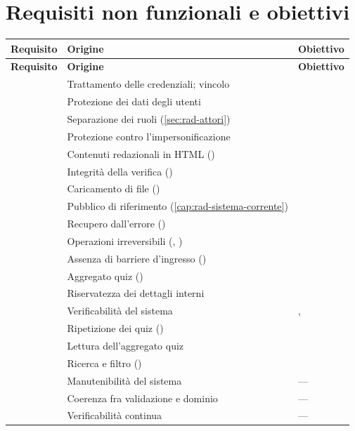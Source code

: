 \section{Requisiti non funzionali e obiettivi}

\begin{longtable}{@{}l L{8.8cm} L{3.0cm}@{}}
\toprule
\textbf{Requisito} & \textbf{Origine} & \textbf{Obiettivo} \\
\midrule
\endfirsthead
\toprule
\textbf{Requisito} & \textbf{Origine} & \textbf{Obiettivo} \\
\midrule
\endhead
\bottomrule
\endlastfoot

 & Trattamento delle credenziali; vincolo  &  \\
 & Protezione dei dati degli utenti &  \\
 & Separazione dei ruoli (\cref{sec:rad-attori}) &  \\
 & Protezione contro l'impersonificazione &  \\
 & Contenuti redazionali in HTML () &  \\
 & Integrità della verifica () &  \\
 & Caricamento di file () &  \\
\midrule
{} & Pubblico di riferimento (\cref{cap:rad-sistema-corrente}) &  \\
 & Recupero dall'errore () &  \\
 & Operazioni irreversibili (, ) &  \\
 & Assenza di barriere d'ingresso () &  \\
\midrule
{} & Aggregato quiz () &  \\
 & Riservatezza dei dettagli interni &  \\
 & Verificabilità del sistema & ,  \\
 & Ripetizione dei quiz () &  \\
\midrule
{} & Lettura dell'aggregato quiz &  \\
 & Ricerca e filtro () &  \\
\midrule
{} & Manutenibilità del sistema & --- \\
 & Coerenza fra validazione e dominio & --- \\
 & Verificabilità continua & --- \\

\end{longtable}

